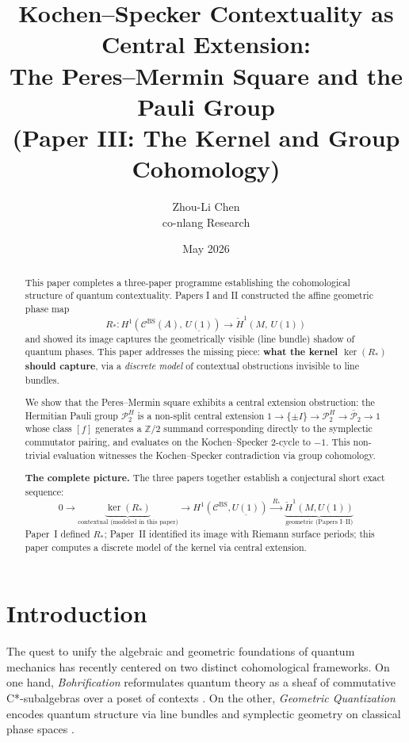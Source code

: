 \documentclass[11pt]{article}
\title{Kochen--Specker Contextuality as Central Extension:\\
The Peres--Mermin Square and the Pauli Group\\
{\large (Paper III: The Kernel and Group Cohomology)}}
\author{Zhou-Li Chen \\ co-nlang Research}
\date{May 2026}
\begin{document}
\maketitle

\begin{abstract}
This paper completes a three-paper programme establishing the cohomological
structure of quantum contextuality. Papers I and II constructed the affine
geometric phase map
\[
  R_*: H^1(\mathcal{C}^{\mathrm{BS}}(A),\, \underline{U(1)})
  \longrightarrow \check{H}^1(M,\, U(1))
\]
and showed its image captures the geometrically visible (line bundle) shadow
of quantum phases. This paper addresses the missing piece:
\textbf{what the kernel $\ker(R_*)$ should capture}, via a \emph{discrete model} of
contextual obstructions invisible to line bundles.

We show that the Peres--Mermin square exhibits a central extension
obstruction: the Hermitian Pauli group $\mathcal{P}_2^H$ is a non-split central
extension $1 \to \{\pm I\} \to \mathcal{P}_2^H \to \bar{\mathcal{P}}_2 \to 1$
whose class $[f]$ generates a $\mathbb{Z}/2$ summand corresponding directly to the
symplectic commutator pairing, and evaluates on the Kochen--Specker 2-cycle to $-1$.
This non-trivial evaluation witnesses the Kochen--Specker contradiction via group cohomology.

\textbf{The complete picture.} The three papers together establish a
conjectural short exact sequence:
\[
  0 \longrightarrow \underbrace{\ker(R_*)}_{\text{contextual (modeled in this paper)}}
  \longrightarrow H^1(\mathcal{C}^{\mathrm{BS}}, \underline{U(1)})
  \xrightarrow{\;R_*\;} \underbrace{\check{H}^1(M, U(1))}_{\text{geometric (Papers I--II)}}
\]
Paper~I defined $R_*$; Paper~II identified its image with Riemann surface
periods; this paper computes a discrete model of the kernel via central extension.
\end{abstract}

\section{Introduction}

The quest to unify the algebraic and geometric foundations of quantum mechanics has recently centered on two distinct cohomological frameworks. On one hand, \emph{Bohrification} reformulates quantum theory as a sheaf of commutative C*-subalgebras over a poset of contexts \cite{Lan16}. On the other, \emph{Geometric Quantization} encodes quantum structure via line bundles and symplectic geometry on classical phase spaces \cite{BW97}.
\end{document}
